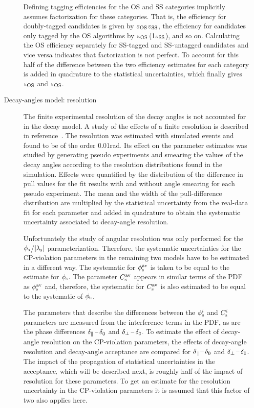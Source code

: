 \begin{description}
Defining tagging efficiencies for the OS and SS categories implicitly assumes factorization for these categories.  That is, the efficiency
for doubly-tagged candidates is given by $\tagCatCoef[\text{OS}]\,\tagCatCoef[\text{SS}]$, the efficiency for candidates only tagged by the
OS algorithms by $\tagCatCoef[\text{OS}]$\,(1\textminus$\tagCatCoef[\text{SS}]$), and so on. Calculating the OS efficiency separately for
SS-tagged and SS-untagged candidates and vice versa indicates that factorization is not perfect. To account for this half of the difference
between the two efficiency estimates for each category is added in quadrature to the statistical uncertainties, which finally gives
$\tagCatCoef[\text{OS}]$ and $\tagCatCoef[\text{OS}]$.

\item[Decay-angles model: resolution]
The finite experimental resolution of the decay angles is not accounted for in the decay model. A study of the effects of a finite
resolution is described in reference~\cite{LHCb-ANA-2014-039}. The resolution was estimated with simulated events and found to be of the
order 0.01\unitsp{}rad. Its effect on the parameter estimates was studied by generating pseudo experiments and smearing the values of the
decay angles according to the resolution distributions found in the simulation. Effects were quantified by the distribution of the
difference in pull values for the fit results with and without angle smearing for each pseudo experiment. The mean and the width of the
pull-difference distribution are multiplied by the statistical uncertainty from the real-data fit for each parameter and added in
quadrature to obtain the systematic uncertainty associated to decay-angle resolution.

Unfortunately the study of angular resolution was only performed for the $\phis$/$\lamsAbs$ parameterization. Therefore, the systematic
uncertainties for the CP-violation parameters in the remaining two models have to be estimated in a different way. The systematic
for $\phisav$ is taken to be equal to the estimate for $\phis$. The parameter $\Csav$ appears in similar terms of the PDF as $\phisav$ and,
therefore, the systematic for $\Csav$ is also estimated to be equal to the systematic of $\phis$.

The parameters that describe the differences between the $\phisi$ and $\Csi$ parameters are measured from the interference terms in the
PDF, as are the phase differences $\delparzero$ and $\delperpzero$. To estimate the effect of decay-angle resolution on the CP-violation
parameters, the effects of decay-angle resolution and decay-angle acceptance are compared for $\delparzero$ and $\delperpzero$. The impact
of the propagation of statistical uncertainties in the acceptance, which will be described next, is roughly half of the impact of
resolution for these parameters. To get an estimate for the resolution uncertainty in the CP-violation parameters it is assumed that this
factor of two also applies here.


\end{description}
